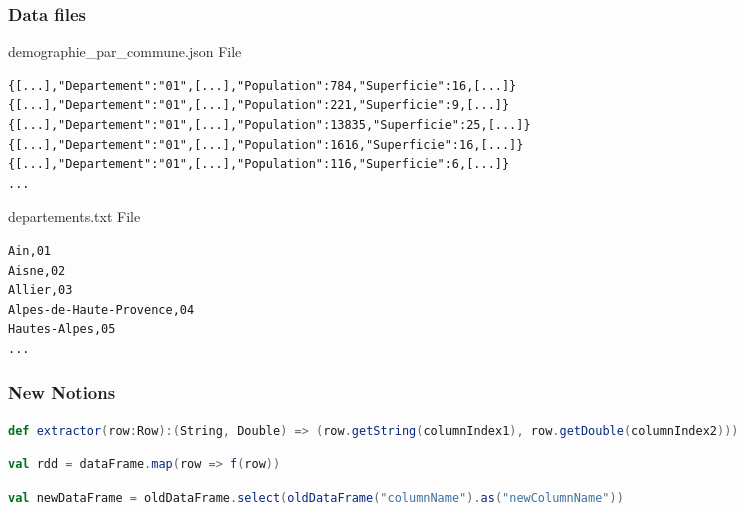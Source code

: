 \documentclass[slidetop,9pt,utf8]{beamer}
\begin{document}
\begin{CJK}{UTF8}{gbsn}
\begin{frame}
\end{frame}

\begin{frame}[fragile]
  \frametitle{Data files}

  \begin{block}{demographie\_par\_commune.json File}
    \begin{verbatim}
{[...],"Departement":"01",[...],"Population":784,"Superficie":16,[...]}
{[...],"Departement":"01",[...],"Population":221,"Superficie":9,[...]}
{[...],"Departement":"01",[...],"Population":13835,"Superficie":25,[...]}
{[...],"Departement":"01",[...],"Population":1616,"Superficie":16,[...]}
{[...],"Departement":"01",[...],"Population":116,"Superficie":6,[...]}
...
    \end{verbatim}
  \end{block}

  \begin{block}{departements.txt File}
    \begin{verbatim}
Ain,01
Aisne,02
Allier,03
Alpes-de-Haute-Provence,04
Hautes-Alpes,05
...
    \end{verbatim}
  \end{block}


\end{frame}

\begin{frame}[fragile]
  \frametitle{New Notions}

  \begin{lstlisting}[label=ExtractValueFromARow, caption=Extract value from a Row, language=scala, style=code]
def extractor(row:Row):(String, Double) => (row.getString(columnIndex1), row.getDouble(columnIndex2)))
  \end{lstlisting}

  \begin{lstlisting}[label=DataFrameToRDD, caption=Transform a Data Frame to RDD, language=scala, style=code]
val rdd = dataFrame.map(row => f(row))
  \end{lstlisting}

  \begin{lstlisting}[label=changeNameSelectedColumn, caption=Change name of a column, language=scala, style=code]
val newDataFrame = oldDataFrame.select(oldDataFrame("columnName").as("newColumnName"))
  \end{lstlisting}

\end{frame}

\begin{frame}


\end{frame}
\end{CJK}
\end{document}
